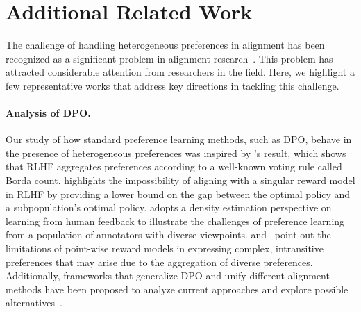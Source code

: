 \section{Additional Related Work}
\label{sec:related_appendix}
The challenge of handling heterogeneous preferences in alignment has been recognized as a significant problem in alignment research~\citep{anwar_foundational_2024, casper_open_2023,ge2024axioms,sorensen_roadmap_2024}. This problem has attracted considerable attention from researchers in the field. Here, we highlight a few representative works that address key directions in tackling this challenge.

\paragraph{Analysis of DPO.}
Our study of how standard preference learning methods, such as DPO, behave in the presence of heterogeneous preferences was inspired by \citet{siththaranjan2023distributional}'s result, which shows that RLHF aggregates preferences according to a well-known voting rule called Borda count. \citet{chakraborty2024maxmin} highlights the impossibility of aligning with a singular reward model in RLHF by providing a lower bound on the gap between the optimal policy and a subpopulation's optimal policy. \citet{dumoulin2023density} adopts a density estimation perspective on learning from human feedback to illustrate the challenges of preference learning from a population of annotators with diverse viewpoints. \citet{rosset_direct_2024} and~\citet{gao_rebel_2024} point out the limitations of point-wise reward models in expressing complex, intransitive preferences that may arise due to the aggregation of diverse preferences. Additionally, frameworks that generalize DPO and unify different alignment methods have been proposed to analyze current approaches and explore possible alternatives~\citep{chen_mallowspo_2024, tang_generalized_2024, azar2024general, meng2024simpo}.


